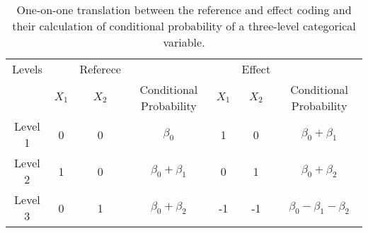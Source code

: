 \begin{table}
\label{tab:code_scheme}
\centering
\begin{tabular}{ccccccc}
\hline
Levels & & Referece& & & Effect &\\
       & $X_1$ & $X_2$ & Conditional Probability & $X_1$ & $X_2$ & Conditional Probability\\
\hline
Level 1 & 0 & 0 & $\beta_0$ & 1 &  0 &  $\beta_0 + \beta_1$\\
Level 2 & 1 & 0 & $\beta_0 + \beta_1$ & 0 & 1 & $\beta_0 + \beta_2$\\
Level 3 & 0 & 1 & $\beta_0 + \beta_2$ & -1 & -1 & $\beta_0 - \beta_1 - \beta_2$\\
\hline
\end{tabular}
\caption{One-on-one translation between the reference and effect coding and their calculation of conditional probability of a three-level categorical variable.}
\end{table}
